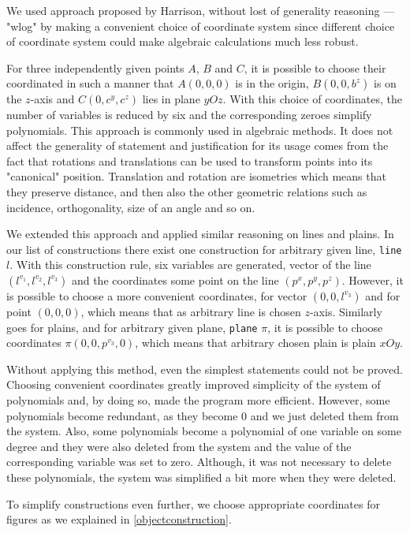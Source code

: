 \documentclass[final,1p,times,authoryear]{elsarticle}
\begin{document}
We used approach proposed by Harrison, without lost of generality
reasoning --- "wlog" \cite{harrison} by making a convenient choice of
coordinate system since different choice of coordinate system could
make algebraic calculations much less robust. 

For three independently given points $A$, $B$ and $C$, it is possible
to choose their coordinated in such a manner that $A(0, 0, 0)$ is in
the origin, $B(0, 0, b^z)$ is on the $z$-axis and $C(0, c^y, c^z)$
lies in plane $yOz$. With this choice of coordinates, the number of
variables is reduced by six and the corresponding zeroes simplify
polynomials. This approach is commonly used in algebraic methods. It
does not affect the generality of statement and justification for its
usage comes from the fact that rotations and translations can be used
to transform points into its "canonical" position. Translation and
rotation are isometries which means that they preserve distance, and
then also the other geometric relations such as incidence,
orthogonality, size of an angle and so on.

We extended this approach and applied similar reasoning on lines and
plains. In our list of constructions there exist one construction for
arbitrary given line, {\tt line} $l$. With this construction rule, six
variables are generated, vector of the line $(l^{v_1}, l^{v_2},
l^{v_3})$ and the coordinates some point on the line $(p^x, p^y,
p^z)$. However, it is possible to choose a more convenient
coordinates, for vector $(0, 0, l^{v_3})$ and for point $(0, 0, 0)$,
which means that as arbitrary line is chosen $z$-axis. Similarly goes
for plains, and for arbitrary given plane, {\tt plane} $\pi$, it is
possible to choose coordinates $\pi (0, 0, p^{v_3}, 0)$, which means
that arbitrary chosen plain is plain $xOy$.

Without applying this method, even the simplest statements could not
be proved. Choosing convenient coordinates greatly improved simplicity
of the system of polynomials and, by doing so, made the program more
efficient. However, some polynomials become redundant, as they become
$0$ and we just deleted them from the system. Also, some polynomials
become a polynomial of one variable on some degree and they were also
deleted from the system and the value of the corresponding variable
was set to zero. Although, it was not necessary to delete these
polynomials, the system was simplified a bit more when they were
deleted.

To simplify constructions even further, we choose appropriate
coordinates for figures as we explained in \ref{objectconstruction}.
\end{document}
